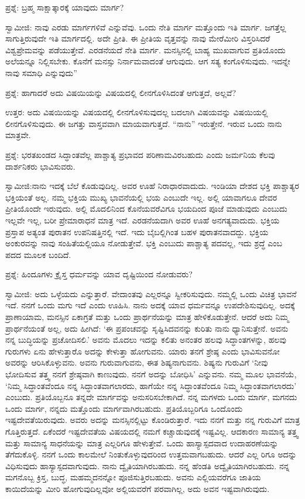 ಪ್ರಶ್ನೆ: ಬ್ರಹ್ಮ ಸಾಕ್ಷಾತ್ಕಾರಕ್ಕೆ ಯಾವುದು ಮಾರ್ಗ?

ಸ್ವಾಮೀಜಿ: ನಾವು ಎರಡು ಮಾರ್ಗಗಳಿವೆ ಎನ್ನುವೆವು. ಒಂದು ನೇತಿ ಮಾರ್ಗ ಮತ್ತೊಂದು ಇತಿ ಮಾರ್ಗ. ಜಗತ್ತೆಲ್ಲ ಸಾಗುತ್ತಿರುವುದೇ ಇತಿ ಮಾರ್ಗದಲ್ಲಿ. ಅದೇ ಪ್ರೀತಿ. ಈ ಪ್ರೀತಿಯ ವೃತ್ತವನ್ನು ನಾವು ಮೇರೆಮೀರಿ ವಿಸ್ತರಿಸಿದರೆ ವಿಶ್ವಪ್ರೇಮವನ್ನು ಪಡೆಯುತ್ತೇವೆ. ಎರಡನೆಯದೆ ನೇತಿ ಮಾರ್ಗ. ಮನಸ್ಸಿನಲ್ಲಿ ಬಾಹ್ಯ ಮುಖವಾಗುವ ಪ್ರತಿಯೊಂದು ಅಲೆಯನ್ನೂ ನಿಲ್ಲಿಸಬೇಕು. ಕೊನೆಗೆ ಮನಸ್ಸು ನಿರ್ನಾಮವಾದಂತೆ ಆಗುವುದು. ಆಗ ಸತ್ಯ ಕಂಗೊಳಿಸುವುದು. ಇದನ್ನೇ ನಾವು ಸಮಾಧಿ ಎನ್ನುವುದು”

ಪ್ರಶ್ನೆ: ಹಾಗಾದರೆ ಅದು ವಿಷಯಿಯನ್ನು ವಿಷಯದಲ್ಲಿ ಲೀನಗೊಳಿಸಿದಂತೆ ಆಗುತ್ತದೆ, ಅಲ್ಲವೆ?

ಉತ್ತರ: ಅದು ವಿಷಯಿಯನ್ನು ವಿಷಯದಲ್ಲಿ ಲೀನಗೊಳಿಸುವುದಲ್ಲ ಬದಲಾಗಿ ವಿಷಯವನ್ನು ವಿಷಯಿಯಲ್ಲಿ ಲೀನಗೊಳಿಸುವುದು. ಈ ಜಗತ್ತು ವಾಸ್ತವವಾಗಿ ಮಾಯವಾಗುತ್ತದೆ. “ನಾನು” ಇರುತ್ತೇನೆ. ಇರುವ ಒಂದು ನಾನು ಮಾತ್ರವೇ.

ಪ್ರಶ್ನೆ: ಭರತಖಂಡದ ಸಿದ್ಧಾಂತವೆಲ್ಲ ಪಾಶ್ಚಾತ್ಯ ಪ್ರಭಾವದ ಪರಿಣಾಮವಿರಬಹುದು ಎಂದು ಜರ್ಮನಿಯ ಕೆಲವು ದಾರ್ಶನಿಕರು ಭಾವಿಸುವರು.

ಸ್ವಾಮೀಜಿ:ನಾನು ಇದಕ್ಕೆ ಬೆಲೆ ಕೊಡುವುದಿಲ್ಲ. ಅವರ ಊಹೆ ನಿರಾಧಾರವಾದುದು. ಇಂಡಿಯಾ ದೇಶದ ಭಕ್ತಿ ಪಾಶ್ಚಾತ್ಯರ ಭಕ್ತಿಯಂತೆ ಅಲ್ಲ. ನಮ್ಮ ಭಕ್ತಿಯ ಮುಖ್ಯ ಭಾವನೆಯಲ್ಲಿ ಭಯ ಎಂಬುದೇ ಇಲ್ಲ. ಅಲ್ಲಿ ಯಾವಾಗಲೂ ದೇವರ ಪ್ರೀತಿಯೊಂದೇ ಇರುವುದು. ಅಲ್ಲಿ ಮೊದಲಿನಿಂದ ಕೊನೆಯವರೆವಿಗೂ ಭಯದಿಂದ ಪೂಜೆ ಮಾಡುವುದು ಎಂಬುದು ಇಲ್ಲವೇ ಇಲ್ಲ, ಬರೀ ಪ್ರೇಮಾರಾಧನೆ ಮಾತ್ರ ಇದೆ. ಎರಡನೆಯದಾಗಿ ಅವರ ಊಹೆ ಅನಗತ್ಯವಾದುದು. ಭಕ್ತಿಯ ಪ್ರಸ್ತಾಪ ಅತ್ಯಂತ ಪುರಾತನ ಉಪನಿಷತ್ತಿನಲ್ಲಿ ಇದೆ. ಇದು ಬೈಬಲ್ಲಿಗಿಂತ ಬಹಳ ಪುರಾತನವಾದದ್ದು. ಭಕ್ತಿಯ ಅಂಕುರವನ್ನು ನಾವು ಸಂಹಿತೆಯಲ್ಲಿಯೂ ನೋಡುತ್ತೇವೆ. ಭಕ್ತಿ ಎಂಬುದು ಪಾಶ್ಚಾತ್ಯ ಪದವಲ್ಲ, ಇದು ಶ್ರದ್ಧೆ ಎಂಬ ಪದದ ಮೂಲಕ ಬಂದಿದೆ.

ಪ್ರಶ್ನೆ: ಹಿಂದೂಗಳು ಕ್ರೈಸ್ತ ಧರ್ಮವನ್ನು ಯಾವ ದೃಷ್ಟಿಯಿಂದ ನೋಡುವರು?

ಸ್ವಾಮೀಜಿ: ಅದು ಒಳ್ಳೆಯದು ಎನ್ನುತ್ತಾರೆ. ವೇದಾಂತವು ಎಲ್ಲರನ್ನೂ ಸ್ವೀಕರಿಸುವುದು. ನಮ್ಮಲ್ಲಿ ಒಂದು ವಿಚಿತ್ರ ಭಾವನೆ ಇದೆ. ನನಗೆ ಒಂದು ಮಗು ಇದೆ ಎಂದು ಊಹಿಸಿ. ನಾನು ಅದಕ್ಕೆ ಯಾವ ಧರ್ಮವನ್ನೂ ಉಪದೇಶಿಸುವುದಿಲ್ಲ. ಅದಕ್ಕೆ ಪ್ರಾಣಾಯಾಮ, ಮನಸ್ಸಿನ ಏಕಾಗ್ರತೆ ಮತ್ತು ಒಂದು ಪ್ರಾರ್ಥನೆಯನ್ನು ಮಾತ್ರ ಹೇಳಿಕೊಡುತ್ತೇನೆ. ಆದರೆ ಅದು ನಿಮ್ಮ ಪ್ರಾರ್ಥನೆಯಂತೆ ಅಲ್ಲ, ಅದು ಹೀಗಿದೆ: ‘ಈ ಪ್ರಪಂಚವನ್ನು ಸೃಷ್ಟಿಸಿದವನನ್ನು ಕುರಿತು ನಾನು ಧ್ಯಾನಿಸುತ್ತೇನೆ. ಅವನು ನನ್ನ ಬುದ್ಧಿಯನ್ನು ಪ್ರಚೋದಿಸಲಿ.’ ಅವನು ಮೊದಲು ಇದನ್ನು ಕಲಿತು ಅನಂತರ ಹಲವು ಸಿದ್ಧಾಂತಗಳನ್ನು, ಹಲವು ಗುರುಗಳು ಏನು ಹೇಳುತ್ತಾರೊ ಅದನ್ನು ಕೇಳುತ್ತಾ ಹೋಗುವನು. ಯಾರು ತನಗೆ ಶ್ರೇಷ್ಠ ಎಂದು ಭಾವಿಸುವನೋ ಅವರನ್ನು ಆರಿಸಿಕೊಳ್ಳುವನು. ಅವನು ಗುರುವಾಗುವನು, ಈತ ಶಿಷ್ಯನಾಗುವನು. ಶಿಷ್ಯನು ಗುರುವಿಗೆ ‘ನೀವು ಭೋದಿಸುವ ತತ್ತ್ವ ನನಗೆ ಶ್ರೇಷ್ಠವಾಗಿ ಕಾಣುವುದು. ನನಗೆ ಅದನ್ನು ಬೋಧಿಸಿ’ ಎನ್ನುವನು. ನಮ್ಮ ಮೂಲ ಭಾವನೆಯೆ, ‘ನಿಮ್ಮ ಸಿದ್ಧಾಂತವೆಂದೂ ನನ್ನ ಸಿದ್ಧಾಂತವಾಗಲಾರದು, ಹಾಗೆಯೇ ನನ್ನ ಸಿದ್ಧಾಂತವೆಂದೂ ನಿಮ್ಮ ಸಿದ್ಧಾಂತವಾಗಲಾರದು’ ಎಂಬುದು. ಪ್ರತಿಯೊಬ್ಬನೂ ತನ್ನದೇ ಮಾರ್ಗವನ್ನು ಅನುಸರಿಸಬೇಕಾಗಿದೆ. ನನ್ನ ಮಗಳದು ಒಂದು ಮಾರ್ಗ, ಮಗನದು ಒಂದು ಮಾರ್ಗ, ನನ್ನದು ಮತ್ತೊಂದು ಮಾರ್ಗವಾಗಿರಬಹುದು. ಪ್ರತಿಯೊಬ್ಬರಿಗೂ ಒಂದೊಂದು ಇಷ್ಟದೇವತೆಯಿರುವುದು. ಅವರು ಅದನ್ನು ಮನಸ್ಸಿನಲ್ಲಿಟ್ಟು ಕೊಂಡಿರುತ್ತಾರೆ. ಇದು ನನಗೆ ಮತ್ತು ನನ್ನ ಗುರುವಿಗೆ ಮಾತ್ರ ಗೊತ್ತಿರುತ್ತದೆ. ಏಕೆಂದರೆ ಇಷ್ಟದೇವತೆಯ ವಿಷಯದಲ್ಲಿ ನಮಗೆ ಕಚ್ಚಾಡುವುದಕ್ಕೆ ಇಷ್ಟವಿಲ್ಲ. ಆದಕಾರಣ ಸಾಮಾನ್ಯ ತತ್ತ್ವ ಮತ್ತು ಸಾಮಾನ್ಯ ಸಾಧನೆಯನ್ನು ಮಾತ್ರ ಎಲ್ಲರಿಗೂ ಹೇಳುತ್ತೇವೆ. ಒಂದು ಹಾಸ್ಯಾಸ್ಪದವಾದ ಉದಾಹರಣೆಯನ್ನು ತೆಗೆದುಕೊಳ್ಳಿ. ನನಗೆ ಒಂದು ಕಾಲಮೇಲೆ ನಿಂತುಕೊಳ್ಳುವುದರಿಂದ ಉತ್ತಮವಾಗಬಹುದು. ಆದರೆ ಎಲ್ಲ ರಿಗೂ ಅದನ್ನು ವಿಧಿಸುವುದು ಹಾಸ್ಯಾಸ್ಪದವಾಗುವುದು. ನಾನು ದ್ವೈತಿಯಾಗಿರಬಹುದು. ನನ್ನ ಹೆಂಡತಿ ಅದ್ವೈತಿಯಾಗಿರಬಹುದು. ನನ್ನ ಮಗನೊಬ್ಬ ಕ್ರಿಸ್ತ, ಬುದ್ಧ, ಮಹಮ್ಮದನನ್ನೋ ಪೂಜಿಸುತ್ತಿರಬಹುದು. ಅವನು ಎಲ್ಲಿಯವರೆಗೂ ಜಾತಿಯ ಕಾಯಿದೆಯನ್ನು ಮೀರಿ ಹೋಗುವುದಿಲ್ಲವೋ ಅಲ್ಲಿಯವರೆಗೆ ಪರವಾಗಿಲ್ಲ, ಅದು ಅವನ ಇಷ್ಟವಾಗಿರುವುದು.

